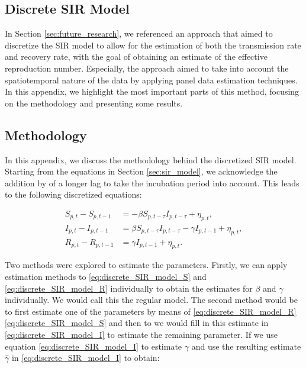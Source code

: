 \documentclass[12pt]{article}
\begin{document}
\begin{appendices}
		\newpage
		\section{Discrete SIR Model} \label{app:discrete_SIR}
		In Section \ref{sec:future_research}, we referenced an approach that aimed to discretize the SIR model to allow for the estimation of both the transmission rate and recovery rate, with the goal of obtaining an estimate of the effective reproduction number. Especially, the approach aimed to take into account the spatiotemporal nature of the data by applying panel data estimation techniques. In this appendix, we highlight the most important parts of this method, focusing on the methodology and presenting some results.
		
		\subsection{Methodology} \label{sapp:discrete_SIR_methodology}
		In this appendix, we discuss the methodology behind the discretized SIR model. Starting from the equations in Section \ref{sec:sir_model}, we acknowledge the addition by \textcite{adda2016economic} of a longer lag to take the incubation period into account. This leads to the following discretized equations:
		
		\begin{align}
        	S_{p,t} - S_{p,t-1} &= -\beta S_{p,t-\tau}I_{p,t-\tau} + \eta_{p,t}, \label{eq:discrete_SIR_model_S}\\
        	I_{p,t} - I_{p,t-1} &= \beta S_{p,t-\tau}I_{p,t-\tau} - \gamma I_{p,t-1} + \eta_{p,t}, \label{eq:discrete_SIR_model_I}\\
        	R_{p,t} - R_{p,t-1} &= \gamma I_{p,t-1} + \eta_{p,t}. \label{eq:discrete_SIR_model_R}
    	\end{align}
	
    	Two methods were explored to estimate the parameters. Firstly, we can apply estimation methods to \eqref{eq:discrete_SIR_model_S} and \eqref{eq:discrete_SIR_model_R} individually to obtain the estimates for $\beta$ and $\gamma$ individually. We would call this the regular model. The second method would be to first estimate one of the parameters by means of \eqref{eq:discrete_SIR_model_R} \eqref{eq:discrete_SIR_model_S} and then to we would fill in this estimate in \eqref{eq:discrete_SIR_model_I} to estimate the remaining parameter. If we use equation \ref{eq:discrete_SIR_model_I} to estimate $\gamma$ and use the resulting estimate $\hat{\gamma}$ in \eqref{eq:discrete_SIR_model_I} to obtain:
    	    

\end{appendices}
\end{document}

